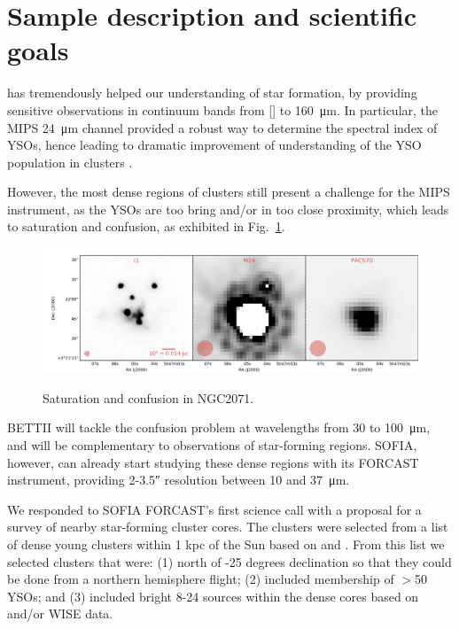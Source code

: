 \section{Sample description and scientific goals}

\Spitzer has tremendously helped our understanding of star formation, by providing sensitive observations in continuum bands from [] to \SI{160}{\micro\meter}. In particular, the MIPS \SI{24}{\micro\meter} channel provided a robust way to determine the spectral index of YSOs, hence leading to dramatic improvement of understanding of the YSO population in clusters \citep[e.g.,][]{Gutermuth:2009gca,Gutermuth:2011he}.

However, the most dense regions of clusters still present a challenge for the MIPS instrument, as the YSOs are too bring and/or in too close proximity, which leads to saturation and confusion, as exhibited in Fig.~\ref{fig:NGC20171_saturated}. 

\begin{figure}[!h]
\begin{center}
\includegraphics[width=\textwidth]{Figures/NGC2071_saturated_mosaic.png}
\label{fig:NGC20171_saturated}
\caption[Saturation and confusion]{Saturation and confusion in NGC2071.}
\end{center}
\end{figure}

BETTII will tackle the confusion problem at wavelengths from 30 to \SI{100}{\micro\meter}, and will be complementary to \Herschel observations of star-forming regions. SOFIA, however, can already start studying these dense regions with its FORCAST instrument, providing 2-\ang{;;3.5} resolution between 10 and \SI{37}{\micro\meter}. 

We responded to SOFIA FORCAST's first science call with a proposal for a survey of nearby star-forming cluster cores. The clusters were selected from a list of dense young clusters within 1 kpc of the Sun based on \citet{Porras:2003kxa} and \citet{Gutermuth:2009gca}. From this list we selected clusters that were: (1) north of -25 degrees declination so that they could be done from a northern hemisphere flight; (2) included membership of $>$50 YSOs; and (3) included bright 8-\SI{24}{\micron} sources within the dense cores based on \Spitzer and/or WISE data. 

